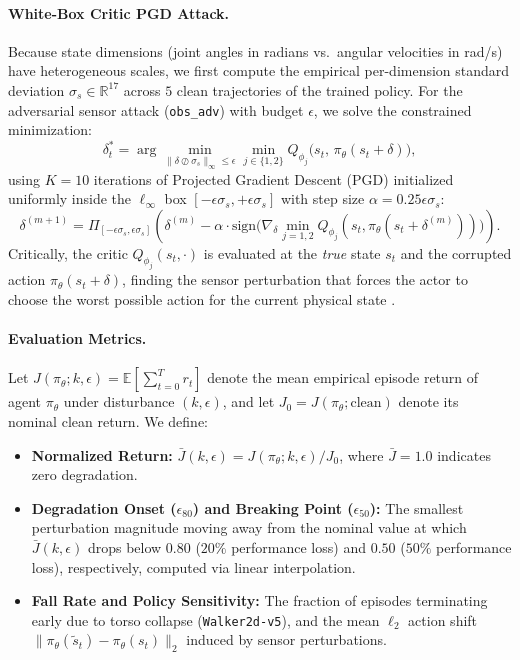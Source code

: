 \documentclass{article}
\begin{document}
\paragraph{White-Box Critic PGD Attack.}
Because state dimensions (joint angles in radians vs.\ angular velocities in rad/s) have heterogeneous scales, we first compute the empirical per-dimension standard deviation $\sigma_s \in \mathbb{R}^{17}$ across $5$ clean trajectories of the trained policy. For the adversarial sensor attack (\texttt{obs\_adv}) with budget $\epsilon$, we solve the constrained minimization:
\begin{equation}
    \delta_t^* = \arg\min_{\|\delta \oslash \sigma_s\|_\infty \le \epsilon} \min_{j \in \{1,2\}} Q_{\phi_j}\big(s_t, \, \pi_\theta(s_t + \delta)\big),
\end{equation}
using $K=10$ iterations of Projected Gradient Descent (PGD) initialized uniformly inside the $\ell_\infty$ box $[-\epsilon \sigma_s, +\epsilon \sigma_s]$ with step size $\alpha = 0.25 \epsilon \sigma_s$:
\begin{equation}
    \delta^{(m+1)} = \Pi_{[-\epsilon \sigma_s, \epsilon \sigma_s]} \left( \delta^{(m)} - \alpha \cdot \text{sign}\big( \nabla_{\delta} \min_{j=1,2} Q_{\phi_j}(s_t, \pi_\theta(s_t + \delta^{(m)})) \big) \right).
\end{equation}
Critically, the critic $Q_{\phi_j}(s_t, \cdot)$ is evaluated at the \emph{true} state $s_t$ and the corrupted action $\pi_\theta(s_t + \delta)$, finding the sensor perturbation that forces the actor to choose the worst possible action for the current physical state \citep{zhang2020robust}.

\paragraph{Evaluation Metrics.}
Let $J(\pi_\theta; k, \epsilon) = \mathbb{E}[\sum_{t=0}^{T} r_t]$ denote the mean empirical episode return of agent $\pi_\theta$ under disturbance $(k, \epsilon)$, and let $J_0 = J(\pi_\theta; \text{clean})$ denote its nominal clean return. We define:
\begin{itemize}
    \item \textbf{Normalized Return:} $\bar{J}(k, \epsilon) = J(\pi_\theta; k, \epsilon) / J_0$, where $\bar{J} = 1.0$ indicates zero degradation.
    \item \textbf{Degradation Onset ($\epsilon_{80}$) and Breaking Point ($\epsilon_{50}$):} The smallest perturbation magnitude moving away from the nominal value at which $\bar{J}(k, \epsilon)$ drops below $0.80$ ($20\%$ performance loss) and $0.50$ ($50\%$ performance loss), respectively, computed via linear interpolation.
    \item \textbf{Fall Rate and Policy Sensitivity:} The fraction of episodes terminating early due to torso collapse (\texttt{Walker2d-v5}), and the mean $\ell_2$ action shift $\|\pi_\theta(\tilde{s}_t) - \pi_\theta(s_t)\|_2$ induced by sensor perturbations.
\end{itemize}
\end{document}
